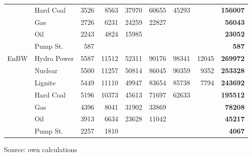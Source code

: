 \begin{table}[htb]
\begin{tabular}{llrrrrrrr}
           &  Hard Coal &       3526 &       8563 &      37970 &      60655 &      45293 &            & {\bf 156007} \\

           &        Gas &       2726 &       6231 &      24259 &      22827 &            &            & {\bf 56043} \\

           &        Oil &       2243 &       4824 &      15985 &            &            &            & {\bf 23052} \\

           &   Pump St. &        587 &            &            &            &            &            &  {\bf 587} \\
\hline
      EnBW & Hydro Power &       5587 &      11512 &      52311 &      90176 &      98341 &      12045 & {\bf 269972} \\

           &    Nuclear &       5500 &      11257 &      50814 &      86045 &      90359 &       9352 & {\bf 253328} \\

           &    Lignite &       5449 &      11110 &      49947 &      83654 &      85738 &       7794 & {\bf 243692} \\

           &  Hard Coal &       5196 &      10373 &      45613 &      71697 &      62633 &            & {\bf 195512} \\

           &        Gas &       4396 &       8041 &      31902 &      33869 &            &            & {\bf 78208} \\

           &        Oil &       3913 &       6634 &      23628 &      11042 &            &            & {\bf 45217} \\

           &   Pump St. &       2257 &       1810 &            &            &            &            & {\bf 4067} \\
\hline
\hline
\end{tabular}  
\label{tab:statlambda}
\begin{center}
Source: own calculations
\end{center}
\end{table}